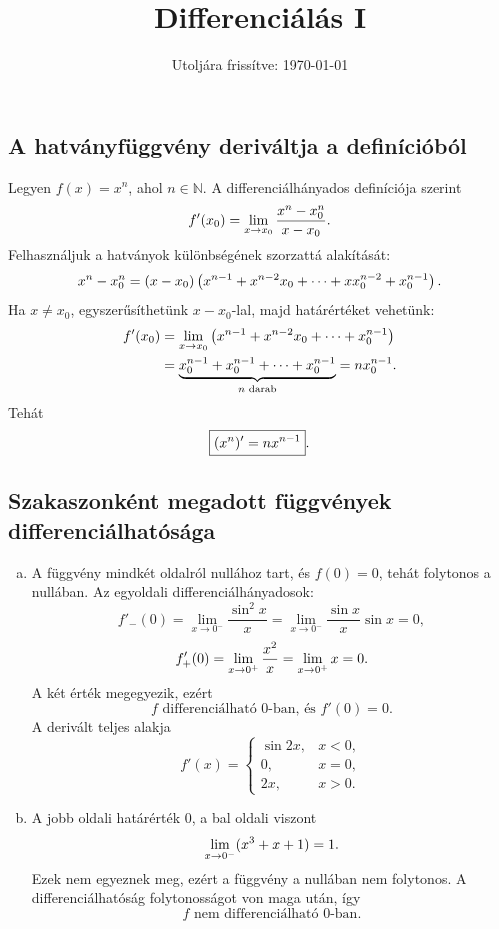 \documentclass{szb-solution}
\title{Differenciálás I}
\date{Utoljára frissítve: \today}
\begin{document}
\maketitle

\subsection{A hatványfüggvény deriváltja a definícióból}

Legyen $f(x)=x^n$, ahol $n\in\mathbb N$. A differenciálhányados definíciója
szerint
$$
  f'(x_0)=\lim_{x\to x_0}\frac{x^n-x_0^n}{x-x_0}
  \text.
$$
Felhasználjuk a hatványok különbségének szorzattá alakítását:
$$
  x^n-x_0^n=(x-x_0)
  \left(x^{n-1}+x^{n-2}x_0+\dots+xx_0^{n-2}+x_0^{n-1}\right)
  \text.
$$
Ha $x\neq x_0$, egyszerűsíthetünk $x-x_0$-lal, majd határértéket vehetünk:
\begin{align*}
  f'(x_0)
  &=\lim_{x\to x_0}
    \left(x^{n-1}+x^{n-2}x_0+\dots+x_0^{n-1}\right)\\
  &=\underbrace{x_0^{n-1}+x_0^{n-1}+\dots+x_0^{n-1}}_{n\text{ darab}}
  =n x_0^{n-1}
  \text.
\end{align*}
Tehát
$$
  \boxed{(x^n)'=nx^{n-1}}
  \text.
$$

\subsection{Szakaszonként megadott függvények differenciálhatósága}

\begin{enumerate}[a)]
  \item A függvény mindkét oldalról nullához tart, és $f(0)=0$, tehát
        folytonos a nullában. Az egyoldali differenciálhányadosok:
        $$
          f'_-(0)=\lim_{x\to0^-}\frac{\sin^2x}{x}
          =\lim_{x\to0^-}\frac{\sin x}{x}\sin x=0,
        $$
        $$
          f'_+(0)=\lim_{x\to0^+}\frac{x^2}{x}
          =\lim_{x\to0^+}x=0
          \text.
        $$
        A két érték megegyezik, ezért
        $$
          \boxed{f\text{ differenciálható }0\text{-ban, és }f'(0)=0.}
        $$
        A derivált teljes alakja
        $$
          f'(x)=
          \begin{cases}
            \sin2x,&x<0,\\
            0,&x=0,\\
            2x,&x>0.
          \end{cases}
        $$

  \item A jobb oldali határérték $0$, a bal oldali viszont
        $$
          \lim_{x\to0^-}(x^3+x+1)=1
          \text.
        $$
        Ezek nem egyeznek meg, ezért a függvény a nullában nem folytonos.
        A differenciálhatóság folytonosságot von maga után, így
        $$
          \boxed{f\text{ nem differenciálható }0\text{-ban}.}
        $$
\end{enumerate}
\end{document}
